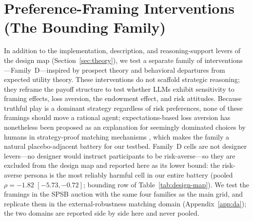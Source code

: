 \section{Preference-Framing Interventions (The Bounding Family)}\label{app:prospect}

In addition to the implementation, description, and reasoning-support levers of the design map (Section~\ref{sec:theory}), we test a separate family of interventions---Family~D---inspired by prospect theory \citep{kahneman1979prospect} and behavioral departures from expected utility theory. These interventions do not scaffold strategic reasoning; they reframe the payoff structure to test whether LLMs exhibit sensitivity to framing effects, loss aversion, the endowment effect, and risk attitudes. Because truthful play is a dominant strategy regardless of risk preferences, none of these framings should move a rational agent; expectations-based loss aversion has nonetheless been proposed as an explanation for seemingly dominated choices by humans in strategy-proof matching mechanisms \citep{dreyfuss2022expectations}, which makes the family a natural placebo-adjacent battery for our testbed. Family~D cells are not designer levers---no designer would instruct participants to be risk-averse---so they are excluded from the design map and reported here as its lower bound: the risk-averse persona is the most reliably harmful cell in our entire battery (pooled $\rho = -1.82$ $[-5.73, -0.72]$; bounding row of Table~\ref{tab:design-map}). We test the framings in the SPSB auction with the same four families as the main grid, and replicate them in the external-robustness matching domain (Appendix~\ref{app:da}); the two domains are reported side by side here and never pooled.


